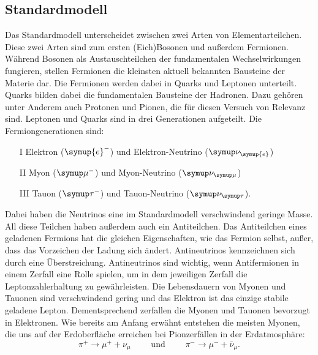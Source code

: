 \documentclass[
  bibliography=totoc,     %
  captions=tableheading,  %
  titlepage=firstiscover, %
]{scrartcl}
\begin{document}
    \subsection{Standardmodell}
    \label{sec:standardmodell}
  Das Standardmodell unterscheidet zwischen zwei Arten von Elementarteilchen.
  Diese zwei Arten sind zum ersten (Eich)Bosonen und außerdem Fermionen.
  Während Bosonen als Austauschteilchen der fundamentalen Wechselwirkungen fungieren,
  stellen Fermionen die kleinsten aktuell bekannten Bausteine der Materie dar.
  Die Fermionen werden dabei in Quarks und Leptonen unterteilt. Quarks bilden
  dabei die fundamentalen Bausteine der Hadronen. Dazu gehören unter Anderem
  auch Protonen und Pionen, die für diesen Versuch von Relevanz sind.
  Leptonen und Quarks sind in drei Generationen aufgeteilt. Die
  Fermiongenerationen sind:
  \begin{itemize}
    \item[I] Elektron ($\symup{e}^-$) und Elektron-Neutrino ($\symup\nu_{\symup{e}}$)
    \item[II] Myon ($\symup\mu^-$) und Myon-Neutrino ($\symup\nu_{\symup\mu}$)
    \item[III] Tauon ($\symup\tau^-$) und Tauon-Neutrino ($\symup\nu_{\symup\tau}$).
  \end{itemize}
  Dabei haben die Neutrinos eine im Standardmodell verschwindend geringe Masse.\\
  All diese Teilchen haben außerdem auch ein Antiteilchen. Das Antiteilchen
  eines geladenen Fermions hat die gleichen Eigenschaften, wie das Fermion
  selbst, außer, dass das Vorzeichen der Ladung sich ändert.
  Antineutrinos kennzeichnen sich durch eine Überstreichung. Antineutrinos sind
  wichtig, wenn Antifermionen in einem Zerfall eine Rolle spielen, um in dem
  jeweiligen Zerfall die Leptonzahlerhaltung zu gewährleisten.
  Die Lebensdauern von Myonen und Tauonen sind verschwindend gering und das
  Elektron ist das einzige stabile geladene Lepton. Dementsprechend zerfallen
  die Myonen und Tauonen bevorzugt in Elektronen. Wie bereits am Anfang erwähnt
  entstehen die meisten Myonen, die uns auf der Erdoberfläche erreichen bei
  Pionzerfällen in der Erdatmosphäre:
  \begin{equation*}
    \pi^+ \to \mu^+ + \nu_{\mu} \qquad \text{ und } \qquad \pi^- \to \mu^- + \bar{\nu}_{\mu} .
    \label{pionzerfälle}
  \end{equation*}
\end{document}
